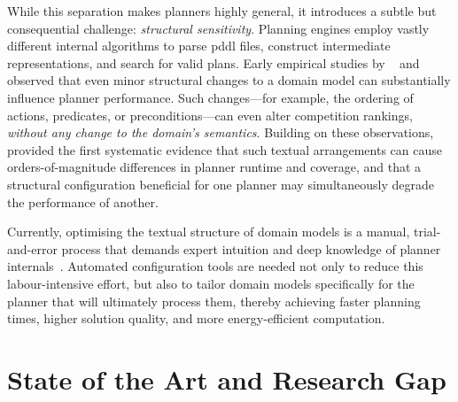 While this separation makes planners highly general, it introduces a subtle but consequential challenge: \emph{structural sensitivity}.
Planning engines employ vastly different internal algorithms to parse \gls{pddl} files, construct intermediate representations, and search for valid plans.
Early empirical studies by \citeauthor{HoweDahlman2002}~\cite{HoweDahlman2002} and \citeauthor{RiddleHolteBarley2011}~\cite{RiddleHolteBarley2011} observed that even minor structural changes to a domain model can substantially influence planner performance. Such changes---for example, the ordering of actions, predicates, or preconditions---can even alter competition rankings, \emph{without any change to the domain's semantics}.
Building on these observations, \citeauthor{Vallati2015}~\cite{Vallati2015, Vallati2021} provided the first systematic evidence that such textual arrangements can cause orders-of-magnitude differences in planner runtime and coverage, and that a structural configuration beneficial for one planner may simultaneously degrade the performance of another.

Currently, optimising the textual structure of domain models is a manual, trial-and-error process that demands expert intuition and deep knowledge of planner internals~\cite{McCluskey2017}.
Automated configuration tools are needed not only to reduce this labour-intensive effort, but also to tailor domain models specifically for the planner that will ultimately process them, thereby achieving faster planning times, higher solution quality, and more energy-efficient computation.

\section{State of the Art and Research Gap}
\label{sec:intro:gap}

